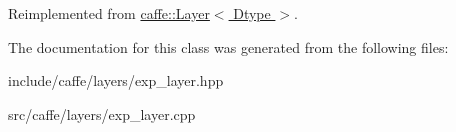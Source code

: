 Reimplemented from \hyperlink{classcaffe_1_1Layer_a38dc2488bf319b8de5a7ac84e0045393}{caffe\+::\+Layer$<$ Dtype $>$}.



The documentation for this class was generated from the following files\+:\begin{DoxyCompactItemize}
\item 
include/caffe/layers/exp\+\_\+layer.\+hpp\item 
src/caffe/layers/exp\+\_\+layer.\+cpp\end{DoxyCompactItemize}
